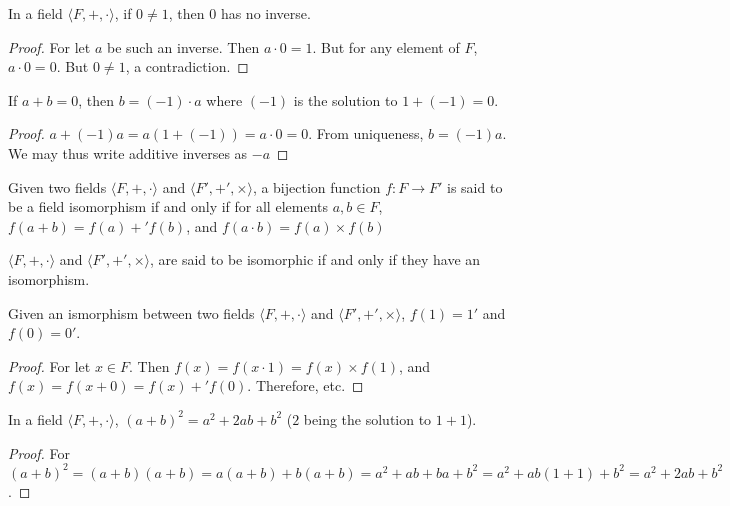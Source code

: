 \documentclass[crop=false,class=book]{standalone}
\begin{document}
\begin{corollary}
In a field $\langle F, +,\cdot \rangle$, if $0\ne 1$, then $0$ has no inverse.
\end{corollary}
\begin{proof}
For let $a$ be such an inverse. Then $a\cdot 0 = 1$. But for any element of $F$, $a \cdot 0 = 0$. But $0\ne 1$, a contradiction.
\end{proof}
\begin{theorem}
If $a+b = 0$, then $b= (-1)\cdot a$ where $(-1)$ is the solution to $1+(-1)=0$.
\end{theorem}
\begin{proof}
$a+(-1)a = a(1+(-1)) = a\cdot 0 = 0$. From uniqueness, $b=(-1)a$. We may thus write additive inverses as $-a$
\end{proof}
\begin{definition}
Given two fields $\langle F,+,\cdot \rangle$ and $\langle F', +',\times \rangle$, a bijection function $f:F\rightarrow F'$ is said to be a field isomorphism if and only if for all elements $a,b\in F$, $f(a+b)=f(a)+'f(b)$, and $f(a\cdot b) = f(a)\times f(b)$
\end{definition}
\begin{definition}
$\langle F,+,\cdot \rangle$ and $\langle F', +',\times \rangle$, are said to be isomorphic if and only if they have an isomorphism.
\end{definition}
\begin{theorem}
Given an ismorphism between two fields $\langle F,+,\cdot \rangle$ and $\langle F', +',\times \rangle$, $f(1) = 1'$ and $f(0) = 0'$.
\end{theorem}
\begin{proof}
For let $x\in F$. Then $f(x)=f(x\cdot 1) = f(x)\times f(1)$, and $f(x)=f(x+0) = f(x)+'f(0)$. Therefore, etc.
\end{proof}
\begin{theorem}
In a field $\langle F,+,\cdot \rangle$, $(a+ b)^2 = a^2 + 2ab + b^2$ ($2$ being the solution to $1+1$).
\end{theorem}
\begin{proof}
For $(a+b)^2 = (a+b)(a+b) = a(a+b)+b(a+b) = a^2 + ab + ba + b^2 = a^2 +ab(1+1)+b^2 = a^2 + 2ab + b^2$.
\end{proof}
\end{document}
